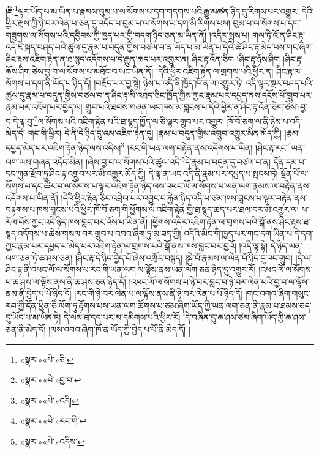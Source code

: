 །ཇི་\footnote{«སྣར་»«པེ་»ཅི་}ལྟར་ཡོད་པ་མ་ཡིན་པ་རྣམས་བུམ་པ་ལ་སོགས་པ་དག་གདགས་པའི་རྒྱུ་མཚན་ཉིད་དུ་རིགས་པར་འགྱུར། དེའི་ཕྱིར་རྫས་ཀྱི་ཉེ་བར་ལེན་པ་ཅན་དུ་འདོད་པ་བུམ་པ་ལ་སོགས་པ་དག་མི་རིགས་པས། བུམ་པ་ལ་སོགས་པ་དག་གཟུགས་ལ་སོགས་པའི་དབྱིབས་ཀྱི་ཁྱད་པར་གྱི་བདག་ཉིད་ཅན་མ་ཡིན་ནོ། །འདིར་སྨྲས་པ། གལ་ཏེ་འོ་ན་ཤིང་རྟ་འདི་ཇི་སྐད་བཤད་པའི་ཚུལ་དུ་རྣམ་པ་བདུན་གྱིས་བཙལ་བ་ན་ཡོད་པ་མ་ཡིན་པ་དེའི་ཚེ་ཤིང་རྟ་མེད་པས་གང་ཞིག་ཤིང་རྟས་འཇིག་རྟེན་ན་ཐ་སྙད་འདོགས་པ་དེ་རྒྱུན་ཆད་པར་འགྱུར་ན། ཤིང་རྟ་འོན་ཅིག །ཤིང་རྟ་ཉོས་ཤིག །ཤིང་རྟ་ཆོས་ཤིག་ཅེས་བྱ་བ་ལ་སོགས་པ་མཐོང་བ་ཡང་ཡིན་ནོ། །དེའི་ཕྱིར་འཇིག་རྟེན་ལ་གྲགས་པའི་ཕྱིར་ན། ཤིང་རྟ་ལ་སོགས་པ་དག་ནི་ཡོད་པ་ཉིད་དོ། །བརྗོད་པར་བྱ་སྟེ། ཉེས་པ་འདི་ནི་ཁྱོད་ཁོ་ན་ལ་འགྱུར་ཏེ། འདི་ལྟར་སྔར་བཤད་པའི་ཚུལ་དུ་རྣམ་པ་བདུན་གྱིས་བཙལ་བ་ན་ཤིང་རྟ་མི་འཐད་ཅིང་ཁྱོད་ཀྱིས་ཀྱང་རྣམ་པར་དཔྱད་ནས་དངོས་པོ་གྲུབ་པར་རྣམ་པར་འཇོག་པར་བྱེད་ལ། གྲུབ་པའི་ཐབས་གཞན་ཡང་ཁས་མ་བླངས་པ་དེའི་ཕྱིར་ན་ཤིང་རྟ་འོན་ཅིག་ཅེས་:བྱ་བ་དེ་ལྟ་བུ་\footnote{«སྣར་»«པེ་»བྱ་བ་}ལ་སོགས་པའི་འཇིག་རྟེན་པའི་ཐ་སྙད་ཁྱོད་ལ་ཅི་ལྟར་གྲུབ་པར་འགྱུར། ཁོ་བོ་ཅག་ལ་ནི་ཉེས་པ་འདི་མེད་དེ། གང་གི་ཕྱིར། དེ་ནི་དེ་ཉིད་དུ་འམ་འཇིག་རྟེན་དུ། །རྣམ་པ་བདུན་གྱིས་འགྲུབ་འགྱུར་མིན་མོད་ཀྱི། །རྣམ་དཔྱད་མེད་པར་འཇིག་རྟེན་ཉིད་ལས་འདིས།\footnote{«སྣར་»«པེ་»འདི།} །རང་གི་ཡན་ལག་བརྟེན་ནས་འདོགས་པ་ཡིན། །ཤིང་རྟ་རང་\footnote{«སྣར་»«པེ་»རང་གི་}ཡན་ལག་ལས་གཞན་འདོད་མིན། །ཞེས་བྱ་བ་ལ་སོགས་པའི་ཚུལ་འདི་\footnote{«སྣར་»«པེ་»འདིས་}དེ་རྣམ་པ་བདུན་དུ་བཙལ་བ་ན། དོན་དམ་པ་དང་ཀུན་རྫོབ་ཏུ་ཤིང་རྟ་འགྲུབ་པར་མི་འགྱུར་མོད་ཀྱི། དེ་ལྟ་ན་ཡང་འདི་ནི་རྣམ་པར་དཔྱད་པ་སྤངས་ཏེ། སྔོན་པོ་ལ་སོགས་པ་དང་ཚོར་བ་ལ་སོགས་པ་ལྟར་འཇིག་རྟེན་ཉིད་ལས་འཕང་ལོ་ལ་སོགས་པ་ཡན་ལག་རྣམས་ལ་བརྟེན་ནས་འདོགས་པ་ཡིན་ནོ། །དེའི་ཕྱིར་རྟེན་ཅིང་འབྲེལ་པར་འབྱུང་བ་རྐྱེན་ཉིད་འདི་པ་ཙམ་ཁས་བླངས་པ་ལྟར་བརྟེན་ནས་བརྟགས་པ་ཁས་བླངས་པའི་ཕྱིར་ཁོ་བོ་ཅག་གི་ཕྱོགས་ལ་འཇིག་རྟེན་གྱི་ཐ་སྙད་ཆད་པར་ཐལ་བར་མི་འགྱུར་ལ། ཕ་རོལ་པོས་ཀྱང་འདི་ཉིད་ཁས་བླང་བར་འོས་པ་ཡིན་ནོ། །ཕྱོགས་འདིར་འཇིག་རྟེན་ལ་གྲགས་པའི་སྒོ་ནས་ཤིང་རྟས་ཐ་སྙད་འདོགས་པ་ཆེས་གསལ་བར་གྲུབ་པ་འབའ་ཞིག་ཏུ་མ་ཟད་ཀྱི། འདིའི་མིང་གི་ཁྱད་པར་གང་དག་ཡིན་པ་དེ་དག་ཀྱང་རྣམ་པར་དཔྱད་པ་མེད་པར་འཇིག་རྟེན་ལ་གྲགས་པའི་སྒོ་ནས་ཁས་བླང་བར་བྱའོ། །འདི་ལྟ་སྟེ། དེ་ཉིད་ཡན་ལག་ཅན་ཏེ་ཆ་ཤས་ཅན། །ཤིང་རྟ་དེ་ཉིད་བྱེད་པོ་ཞེས་འགྲོར་བསྙད། །སྐྱེ་བོ་རྣམས་ལ་ལེན་པོ་ཉིད་དུ་འང་གྲུབ། །དེ་ལ་ཤིང་རྟ་ནི་འཕང་ལོ་ལ་སོགས་པ་རང་གི་ཡན་ལག་ལ་ལྟོས་ནས་ཡན་ལག་ཅན་ཉིད་དུ་འགྱུར་རོ། །འཕང་ལོ་ལ་སོགས་པ་ཆ་ཤས་ལ་ལྟོས་ནས་ནི་ཆ་ཤས་ཅན་ཉིད་དོ། །འཕང་ལོ་ལ་སོགས་པ་ཉེ་བར་བླང་བ་ཉེ་བར་ལེན་པའི་བྱ་བ་ལ་ལྟོས་ནས་ནི་བྱེད་པ་པོ་ཉིད་དོ། །རང་གི་ཉེ་བར་ལེན་པ་ལ་ལྟོས་ནས་ནི་ཉེ་བར་ལེན་པ་པོ་ཉིད་དོ། །གང་འགའ་ཞིག་གསུང་རབ་ཀྱི་དོན་ཕྱིན་ཅི་ལོག་ཏུ་རྟོགས་པས་ཡན་ལག་ཚོགས་པ་ཙམ་ཞིག་ཡོད་ཀྱི་ཡན་ལག་ཅན་ནི་རྣམ་པ་ཐམས་ཅད་དུ་ཡོད་པ་མ་ཡིན་ཏེ། དེ་ལས་ཐ་དད་པར་མ་དམིགས་པའི་ཕྱིར་རོ། །དེ་བཞིན་དུ་ཆ་ཤས་ཙམ་ཞིག་ཡོད་ཀྱི་ཆ་ཤས་ཅན་ནི་མེད་དོ། །ལས་འབའ་ཞིག་ཁོ་ན་ཡོད་ཀྱི་བྱེད་པ་པོ་ནི་མེད་དོ། །
